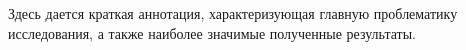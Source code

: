 Здесь дается краткая аннотация, характеризующая главную проблематику исследования, а также наиболее значимые полученные результаты.